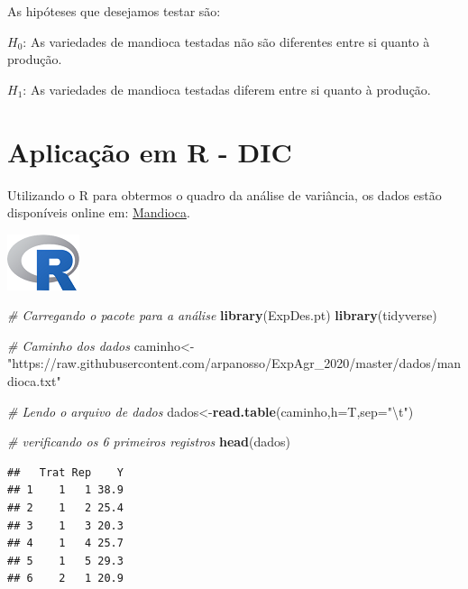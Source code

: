\documentclass[
]{book}
\newenvironment{Shaded}{\begin{snugshade}}{\end{snugshade}}
\newcommand{\CharTok}[1]{\textcolor[rgb]{0.31,0.60,0.02}{#1}}
\newcommand{\CommentTok}[1]{\textcolor[rgb]{0.56,0.35,0.01}{\textit{#1}}}
\newcommand{\DataTypeTok}[1]{\textcolor[rgb]{0.13,0.29,0.53}{#1}}
\newcommand{\KeywordTok}[1]{\textcolor[rgb]{0.13,0.29,0.53}{\textbf{#1}}}
\newcommand{\NormalTok}[1]{#1}
\newcommand{\OperatorTok}[1]{\textcolor[rgb]{0.81,0.36,0.00}{\textbf{#1}}}
\newcommand{\StringTok}[1]{\textcolor[rgb]{0.31,0.60,0.02}{#1}}
\begin{document}
As hipóteses que desejamos testar são:

\(H_0\): As variedades de mandioca testadas não são diferentes entre si quanto à produção.

\(H_1\): As variedades de mandioca testadas diferem entre si quanto à produção.

\hypertarget{aplicauxe7uxe3o-em-r---dic}{%
\section{Aplicação em R - DIC}\label{aplicauxe7uxe3o-em-r---dic}}

Utilizando o R para obtermos o quadro da análise de variância, os dados estão disponíveis online em: \href{https://raw.githubusercontent.com/arpanosso/ExpAgr_2020/master/dados/mandioca.txt}{Mandioca}.

\includegraphics{Rlogo.png}

\begin{Shaded}
\begin{Highlighting}[]
\CommentTok{# Carregando o pacote para a análise}
\KeywordTok{library}\NormalTok{(ExpDes.pt)}
\KeywordTok{library}\NormalTok{(tidyverse)}


\CommentTok{# Caminho dos dados}
\NormalTok{caminho<-}\StringTok{"https://raw.githubusercontent.com/arpanosso/ExpAgr_2020/master/dados/mandioca.txt"}

\CommentTok{# Lendo o arquivo de dados}
\NormalTok{dados<-}\KeywordTok{read.table}\NormalTok{(caminho,}\DataTypeTok{h=}\NormalTok{T,}\DataTypeTok{sep=}\StringTok{"}\CharTok{\textbackslash{}t}\StringTok{"}\NormalTok{)}

\CommentTok{# verificando os 6 primeiros registros}
\KeywordTok{head}\NormalTok{(dados)}
\end{Highlighting}
\end{Shaded}

\begin{verbatim}
##   Trat Rep    Y
## 1    1   1 38.9
## 2    1   2 25.4
## 3    1   3 20.3
## 4    1   4 25.7
## 5    1   5 29.3
## 6    2   1 20.9
\end{verbatim}

\begin{Shaded}
\end{Shaded}
\end{document}
